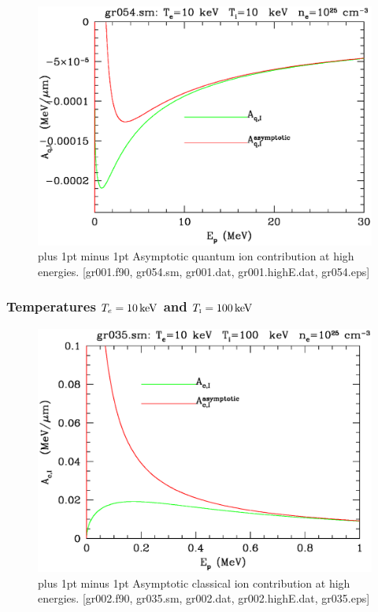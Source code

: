 \documentclass[preprint,12pt,eqsecnum,nofootinbib,amsmath,amssymb]{revtex4}
\newcommand{\smI}{{\rm\scriptscriptstyle I}}
\newcommand{\footnoteskip}{\baselineskip 12pt plus 1pt minus 1pt}
\begin{document}
\vskip-2cm 
\begin{figure}[h!]
\includegraphics[scale=0.45]{gr054.eps} 
\vskip-0.8cm 
\caption{\footnoteskip  
  Asymptotic quantum ion contribution at high energies. [gr001.f90,
  gr054.sm, gr001.dat, gr001.highE.dat, gr054.eps] 
}
\label{fig:gr054}
\end{figure}

\pagebreak
\subsubsection{Temperatures $T_e=10\,{\rm keV}$ and $T_\smI=100\,{\rm keV}$}

\vskip-2cm 
\begin{figure}[h!]
\includegraphics[scale=0.45]{gr035.eps} 
\vskip-0.8cm 
\caption{\footnoteskip  
  Asymptotic classical ion contribution at high energies. [gr002.f90,
  gr035.sm, gr002.dat, gr002.highE.dat, gr035.eps] 
}
\label{fig:gr035}
\end{figure}
\end{document}
